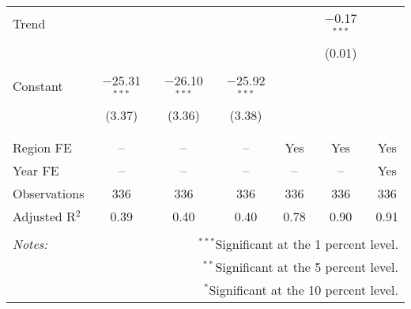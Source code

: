 \documentclass[10pt]{article}
\begin{document}
\begin{table}[!htbp]
\begin{tabular}{@{\extracolsep{5pt}}lcccccc}
 Trend &  &  &  &  & $-$0.17$^{***}$ &  \\ 
  &  &  &  &  & (0.01) &  \\ 
  & & & & & & \\ 
 Constant & $-$25.31$^{***}$ & $-$26.10$^{***}$ & $-$25.92$^{***}$ &  &  &  \\ 
  & (3.37) & (3.36) & (3.38) &  &  &  \\ 
  & & & & & & \\ 
\hline \\[-1.8ex] 
Region FE & -- & -- & -- & Yes & Yes & Yes \\ 
Year FE & -- & -- & -- & -- & -- & Yes \\ 
Observations & 336 & 336 & 336 & 336 & 336 & 336 \\ 
Adjusted R$^{2}$ & 0.39 & 0.40 & 0.40 & 0.78 & 0.90 & 0.91 \\ 
\hline 
\hline \\[-1.8ex] 
\textit{Notes:} & \multicolumn{6}{r}{$^{***}$Significant at the 1 percent level.} \\ 
 & \multicolumn{6}{r}{$^{**}$Significant at the 5 percent level.} \\ 
 & \multicolumn{6}{r}{$^{*}$Significant at the 10 percent level.} \\ 
\end{tabular} 
\end{table} 
\end{document}
